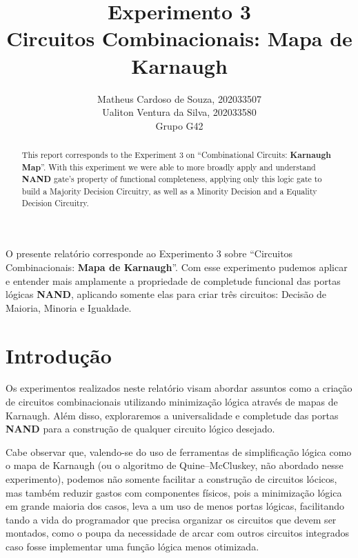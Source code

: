 \documentclass[12pt]{article}
\title{Experimento 3\\
Circuitos Combinacionais: Mapa de Karnaugh}
\author{Matheus Cardoso de Souza, 202033507\\
        Ualiton Ventura da Silva, 202033580\\
        Grupo G42
}
\begin{document}
\maketitle

 \begin{abstract}
   This report corresponds to the Experiment 3 on ``Combinational Circuits:
   \textbf{Karnaugh Map}''. With this experiment we were able to more broadly
   apply and understand \textbf{NAND} gate's property of functional
   completeness, applying only this logic gate to build a Majority Decision
   Circuitry, as well as a Minority Decision and a Equality Decision Circuitry.
 \end{abstract}

 \begin{resumo}
   O presente relatório corresponde ao Experimento 3 sobre ``Circuitos
   Combinacionais: \textbf{Mapa de Karnaugh}''. Com esse experimento pudemos
   aplicar e entender mais amplamente a propriedade de completude funcional das
   portas lógicas \textbf{NAND}, aplicando somente elas para criar três
   circuitos: Decisão de Maioria, Minoria e Igualdade.
 \end{resumo}


\section{Introdução}
\label{sec:Introducao}


Os experimentos realizados neste relatório visam abordar assuntos como a
criação de circuitos combinacionais utilizando minimização lógica através de
mapas de Karnaugh. Além disso, exploraremos a universalidade e completude das
portas \textbf{NAND} para a construção de qualquer circuito lógico desejado.

Cabe observar que, valendo-se do uso de ferramentas de simplificação lógica como
o mapa de Karnaugh (ou o algoritmo de Quine–McCluskey, não abordado nesse
experimento), podemos não somente facilitar a construção de circuitos lócicos,
mas também reduzir gastos com componentes físicos, pois a minimização lógica em
grande maioria dos casos, leva a um uso de menos portas lógicas, facilitando
tando a vida do programador que precisa organizar os circuitos que devem ser
montados, como o poupa da necessidade de arcar com outros circuitos integrados
caso fosse implementar uma função lógica menos otimizada.
\end{document}
